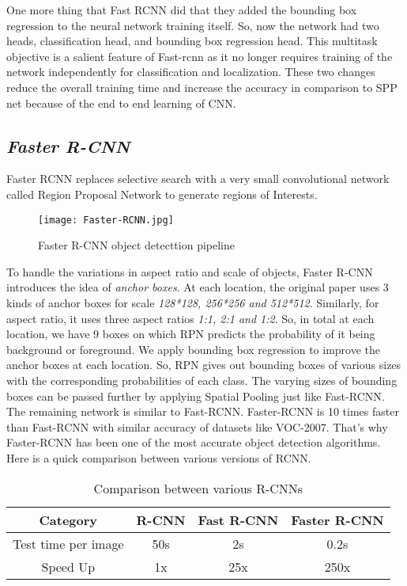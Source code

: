 		One more thing that Fast RCNN did that they added the bounding box regression to the neural network training itself. So, now the network had two heads, classification head, and bounding box regression head. This multitask objective is a salient feature of Fast-rcnn as it no longer requires training of the network independently for classification and localization. These two changes reduce the overall training time and increase the accuracy in comparison to SPP net because of the end to end learning of CNN.
		
	\subsection{\emph{Faster R-CNN}}
		Faster RCNN replaces selective search with a very small convolutional network called Region Proposal Network to generate regions of Interests.~\cite{ren2015faster}
		\begin{figure}[htbp]
			\centering
			\texttt{[image: Faster-RCNN.jpg]}
			\caption{Faster R-CNN object detecttion pipeline\label{Faster R-CNN object detecttion pipeline}}
		\end{figure}
		
		To handle the variations in aspect ratio and scale of objects, Faster R-CNN introduces the idea of \emph{anchor boxes}. At each location, the original paper uses 3 kinds of anchor boxes for scale \emph{128*128, 256*256 and 512*512}. Similarly, for aspect ratio, it uses three aspect ratios \emph{1:1, 2:1 and 1:2}. So, in total at each location, we have 9 boxes on which RPN predicts the probability of it being background or foreground. We apply bounding box regression to improve the anchor boxes at each location. So, RPN gives out bounding boxes of various sizes with the corresponding probabilities of each class. The varying sizes of bounding boxes can be passed further by applying Spatial Pooling just like Fast-RCNN. The remaining network is similar to Fast-RCNN. Faster-RCNN is 10 times faster than Fast-RCNN with similar accuracy of datasets like VOC-2007. That’s why Faster-RCNN has been one of the most accurate object detection algorithms. Here is a quick comparison between various versions of RCNN.
		\begin{table}[h!]
			\centering
			\begin{tabular}{| c | c | c | c |}
				\hline
				Category	& R-CNN & Fast R-CNN	& Faster R-CNN	\\ \hline  \hline
				Test time per image		& 50s	& 2s	& 0.2s\\ \hline
				Speed Up	& 1x	& 25x	& 250x\\ \hline
			\end{tabular}
			\caption{Comparison between various R-CNNs}
			\label{table:Comparison between various R-CNNsTime Analysis}
		\end{table}
	
